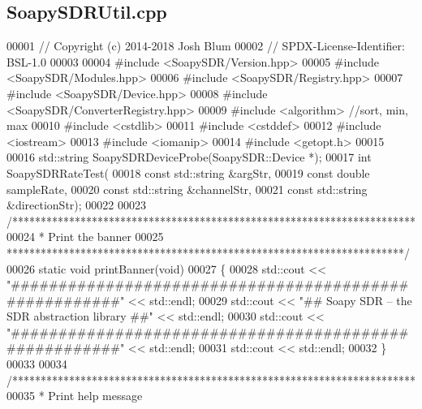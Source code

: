 \subsection{Soapy\+S\+D\+R\+Util.\+cpp}
\label{SoapySDRUtil_8cpp_source}

\begin{DoxyCode}
00001 \textcolor{comment}{// Copyright (c) 2014-2018 Josh Blum}
00002 \textcolor{comment}{// SPDX-License-Identifier: BSL-1.0}
00003 
00004 \textcolor{preprocessor}{#include <SoapySDR/Version.hpp>}
00005 \textcolor{preprocessor}{#include <SoapySDR/Modules.hpp>}
00006 \textcolor{preprocessor}{#include <SoapySDR/Registry.hpp>}
00007 \textcolor{preprocessor}{#include <SoapySDR/Device.hpp>}
00008 \textcolor{preprocessor}{#include <SoapySDR/ConverterRegistry.hpp>}
00009 \textcolor{preprocessor}{#include <algorithm>} \textcolor{comment}{//sort, min, max}
00010 \textcolor{preprocessor}{#include <cstdlib>}
00011 \textcolor{preprocessor}{#include <cstddef>}
00012 \textcolor{preprocessor}{#include <iostream>}
00013 \textcolor{preprocessor}{#include <iomanip>}
00014 \textcolor{preprocessor}{#include <getopt.h>}
00015 
00016 std::string SoapySDRDeviceProbe(SoapySDR::Device *);
00017 \textcolor{keywordtype}{int} SoapySDRRateTest(
00018     \textcolor{keyword}{const} std::string &argStr,
00019     \textcolor{keyword}{const} \textcolor{keywordtype}{double} sampleRate,
00020     \textcolor{keyword}{const} std::string &channelStr,
00021     \textcolor{keyword}{const} std::string &directionStr);
00022 
00023 \textcolor{comment}{/***********************************************************************}
00024 \textcolor{comment}{ * Print the banner}
00025 \textcolor{comment}{ **********************************************************************/}
00026 \textcolor{keyword}{static} \textcolor{keywordtype}{void} printBanner(\textcolor{keywordtype}{void})
00027 \{
00028     std::cout << \textcolor{stringliteral}{"######################################################"} << std::endl;
00029     std::cout << \textcolor{stringliteral}{"##     Soapy SDR -- the SDR abstraction library     ##"} << std::endl;
00030     std::cout << \textcolor{stringliteral}{"######################################################"} << std::endl;
00031     std::cout << std::endl;
00032 \}
00033 
00034 \textcolor{comment}{/***********************************************************************}
00035 \textcolor{comment}{ * Print help message}

\end{DoxyCode}
